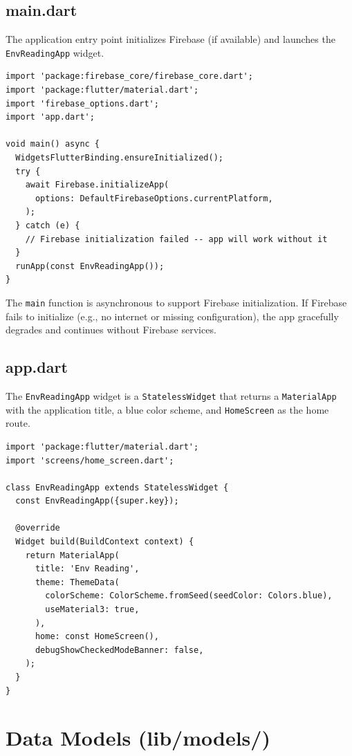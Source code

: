 \documentclass[12pt,a4paper,oneside]{report}
\newcommand{\code}[1]{\texttt{#1}}
\begin{document}
\section{main.dart}

The application entry point initializes Firebase (if available) and launches the \code{EnvReadingApp} widget.

\begin{lstlisting}[style=dartstyle]
import 'package:firebase_core/firebase_core.dart';
import 'package:flutter/material.dart';
import 'firebase_options.dart';
import 'app.dart';

void main() async {
  WidgetsFlutterBinding.ensureInitialized();
  try {
    await Firebase.initializeApp(
      options: DefaultFirebaseOptions.currentPlatform,
    );
  } catch (e) {
    // Firebase initialization failed -- app will work without it
  }
  runApp(const EnvReadingApp());
}
\end{lstlisting}

The \code{main} function is asynchronous to support Firebase initialization. If Firebase fails to initialize (e.g., no internet or missing configuration), the app gracefully degrades and continues without Firebase services.

\section{app.dart}

The \code{EnvReadingApp} widget is a \code{StatelessWidget} that returns a \code{MaterialApp} with the application title, a blue color scheme, and \code{HomeScreen} as the home route.

\begin{lstlisting}[style=dartstyle]
import 'package:flutter/material.dart';
import 'screens/home_screen.dart';

class EnvReadingApp extends StatelessWidget {
  const EnvReadingApp({super.key});

  @override
  Widget build(BuildContext context) {
    return MaterialApp(
      title: 'Env Reading',
      theme: ThemeData(
        colorScheme: ColorScheme.fromSeed(seedColor: Colors.blue),
        useMaterial3: true,
      ),
      home: const HomeScreen(),
      debugShowCheckedModeBanner: false,
    );
  }
}
\end{lstlisting}

\chapter{Data Models (lib/models/)}
\label{ch:models}
\end{document}
